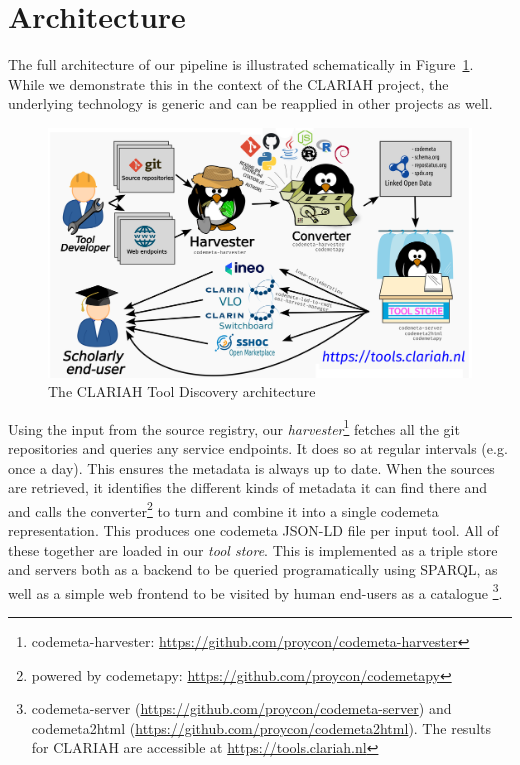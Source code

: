 \documentclass[a4paper,11pt]{article}
\begin{document}
\section{Architecture}

The full architecture of our pipeline is illustrated schematically in
Figure~\ref{fig:architecture}. While we demonstrate this in the context of the
CLARIAH project, the underlying technology is generic and can be reapplied in
other projects as well.

\begin{figure}[h]
\begin{center}
\includegraphics[width=14.0cm]{architecture.png}
\caption{The CLARIAH Tool Discovery architecture}
\end{center}
\label{fig:architecture}
\end{figure}

Using the input from the source registry, our
\emph{harvester}\footnote{codemeta-harvester:
\url{https://github.com/proycon/codemeta-harvester}} fetches all the git
repositories and queries any service endpoints. It does so at regular intervals
(e.g. once a day). This ensures the metadata is always up to date. When the
sources are retrieved, it identifies the different kinds of metadata it can
find there and and calls the converter\footnote{powered by codemetapy:
\url{https://github.com/proycon/codemetapy}} to turn and combine it into a
single codemeta representation. This produces one codemeta JSON-LD file per
input tool. All of these together are loaded in our \emph{tool store}. This is
implemented as a triple store and servers both as a backend to be queried
programatically using SPARQL, as well as a simple web frontend to be visited by
human end-users as a catalogue \footnote{codemeta-server
(\url{https://github.com/proycon/codemeta-server}) and codemeta2html
(\url{https://github.com/proycon/codemeta2html}). The results for CLARIAH are
accessible at \url{https://tools.clariah.nl}}.
\end{document}
